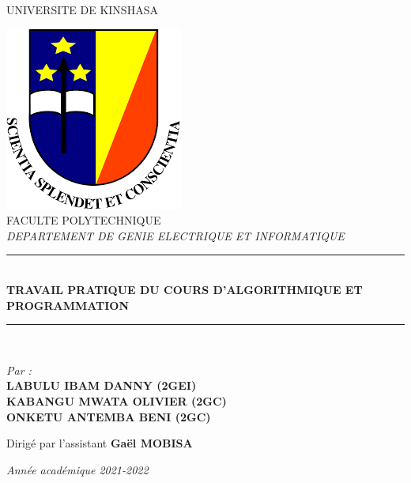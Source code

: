 \documentclass[12pt,a4paper,oneside]{book}
\author{Danny LABULU}
\begin{document}
\newcommand{\HRule}{\rule{\linewidth}{0.5mm}}
\begin{titlepage}
	\vspace{3cm}
	\begin{center}
		
		\begin{Large}
			UNIVERSITE DE KINSHASA\\
		\end{Large}
	\vspace{0.5cm}
	\includegraphics[scale=0.6]{logo_unikin.png}\\
		FACULTE POLYTECHNIQUE\\ 
		\vspace{1cm}
		\textit{DEPARTEMENT DE GENIE ELECTRIQUE ET INFORMATIQUE}\\
		\vspace{2cm}
		\HRule\\[0.5cm]
		{\Large\bfseries{TRAVAIL PRATIQUE DU COURS D'ALGORITHMIQUE ET PROGRAMMATION}} \\[0.5cm]
		\HRule\\[0.5cm]
	\end{center}
\vspace{3cm}
	\begin{center}
		\textit{Par :} \\
		\textbf{LABULU IBAM DANNY  (2GEI)}\\
		\textbf{ \text{  }KABANGU MWATA OLIVIER (2GC)}\\
		\textbf{ONKETU ANTEMBA BENI  (2GC)}\\ %
	\end{center}
\vspace{1cm}
\begin{flushright}
	Dirigé par l'assistant  \textbf{Gaël  MOBISA}
\end{flushright}
	\begin{center}
		\vspace{3.5cm}
		\textit{Année académique 2021-2022}
	\end{center}
\end{titlepage}
\end{document}
